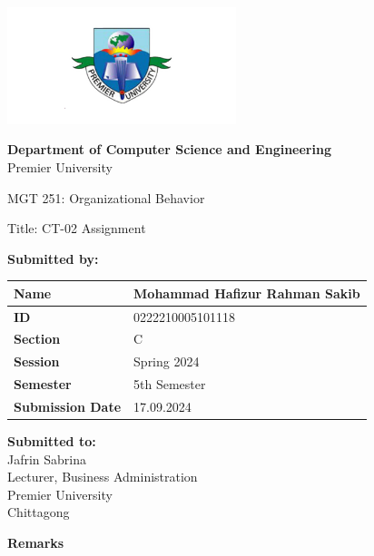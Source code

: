 \documentclass{article}
\renewcommand{\arraystretch}{1.5}
\begin{document}
\begin{titlepage}
    \centering
    \includegraphics[width=0.5\textwidth]{logo.png} %
    \vspace{1cm}

    \textbf{Department of Computer Science and Engineering}\\
    Premier University
    \vspace{1cm}

    \huge \textnormal{MGT 251: Organizational Behavior }
    \vspace{1in} 

    \Large \textnormal{Title: CT-02 Assignment}
    \vspace{0.5in} %

    \large
    \textbf{Submitted by:}
    \vspace{0.5cm}

    \renewcommand{\arraystretch}{1.5} %
    \begin{tabular}{|p{}|p{}|} %
        \hline
        \textbf{Name} & Mohammad Hafizur Rahman Sakib \\
        \hline
        \textbf{ID} & 0222210005101118 \\
        \hline
        \textbf{Section} & C \\
        \hline
        \textbf{Session} & Spring 2024 \\
        \hline
        \textbf{Semester} & 5th Semester \\
        \hline
        \textbf{Submission Date} & 17.09.2024 \\
        \hline
    \end{tabular}
    \vspace{1cm}

    \begin{minipage}[t]{0.48\textwidth}
        \textbf{Submitted to:}\\
        Jafrin Sabrina\\
        Lecturer, Business Administration\\
        Premier University\\
        Chittagong
    \end{minipage}%
    \hfill
    \begin{minipage}[t]{0.48\textwidth}
        \raggedleft
        \textbf{Remarks}\\
        \vspace{0.5cm} %
    \end{minipage}


\end{titlepage}
\end{document}

